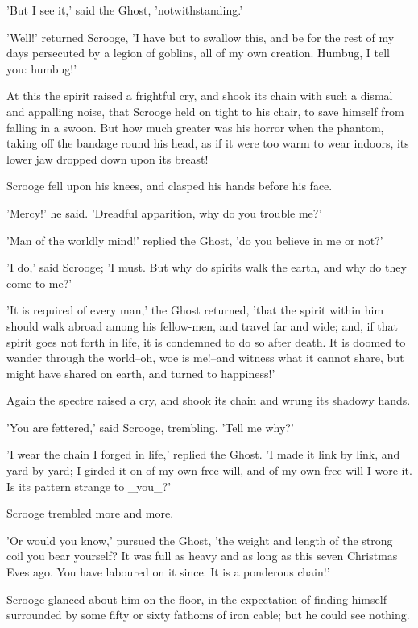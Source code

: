 'But I see it,' said the Ghost, 'notwithstanding.'

'Well!' returned Scrooge, 'I have but to swallow this, and be for the
rest of my days persecuted by a legion of goblins, all of my own
creation. Humbug, I tell you: humbug!'

At this the spirit raised a frightful cry, and shook its chain with such
a dismal and appalling noise, that Scrooge held on tight to his chair,
to save himself from falling in a swoon. But how much greater was his
horror when the phantom, taking off the bandage round his head, as if it
were too warm to wear indoors, its lower jaw dropped down upon its
breast!

Scrooge fell upon his knees, and clasped his hands before his face.

'Mercy!' he said. 'Dreadful apparition, why do you trouble me?'

'Man of the worldly mind!' replied the Ghost, 'do you believe in me or
not?'

'I do,' said Scrooge; 'I must. But why do spirits walk the earth, and
why do they come to me?'

'It is required of every man,' the Ghost returned, 'that the spirit
within him should walk abroad among his fellow-men, and travel far and
wide; and, if that spirit goes not forth in life, it is condemned to do
so after death. It is doomed to wander through the world--oh, woe is
me!--and witness what it cannot share, but might have shared on earth,
and turned to happiness!'

Again the spectre raised a cry, and shook its chain and wrung its
shadowy hands.

'You are fettered,' said Scrooge, trembling. 'Tell me why?'

'I wear the chain I forged in life,' replied the Ghost. 'I made it link
by link, and yard by yard; I girded it on of my own free will, and of
my own free will I wore it. Is its pattern strange to _you_?'

Scrooge trembled more and more.

'Or would you know,' pursued the Ghost, 'the weight and length of the
strong coil you bear yourself? It was full as heavy and as long as this
seven Christmas Eves ago. You have laboured on it since. It is a
ponderous chain!'

Scrooge glanced about him on the floor, in the expectation of finding
himself surrounded by some fifty or sixty fathoms of iron cable; but he
could see nothing.

